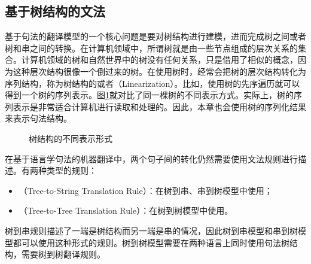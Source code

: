 
\subsection{基于树结构的文法}

\parinterval 基于句法的翻译模型的一个核心问题是要对树结构进行建模，进而完成树之间或者树和串之间的转换。在计算机领域中，所谓树就是由一些节点组成的层次关系的集合。计算机领域的树和自然世界中的树没有任何关系，只是借用了相似的概念，因为这种层次结构很像一个倒过来的树。在使用树时，经常会把树的层次结构转化为序列结构，称为树结构的{\small{}}或者{\small{}}（Linearization）。比如，使用树的先序遍历就可以得到一个树的序列表示。图\ref{fig:4-45}就对比了同一棵树的不同表示方式。实际上，树的序列表示是非常适合计算机进行读取和处理的。因此，本章也会使用树的序列化结果来表示句法结构。

\begin{figure}[htp]
\centering

\caption{树结构的不同表示形式}
\label{fig:4-45}
\end{figure}

\parinterval 在基于语言学句法的机器翻译中，两个句子间的转化仍然需要使用文法规则进行描述。有两种类型的规则：

\begin{itemize}
\vspace{0.5em}
\item {\small{}}（Tree-to-String Translation Rule）：在树到串、串到树模型中使用；
\vspace{0.5em}
\item {\small{}}（Tree-to-Tree Translation Rule）：在树到树模型中使用。
\vspace{0.5em}
\end{itemize}

\parinterval 树到串规则描述了一端是树结构而另一端是串的情况，因此树到串模型和串到树模型都可以使用这种形式的规则。树到树模型需要在两种语言上同时使用句法树结构，需要树到树翻译规则。

